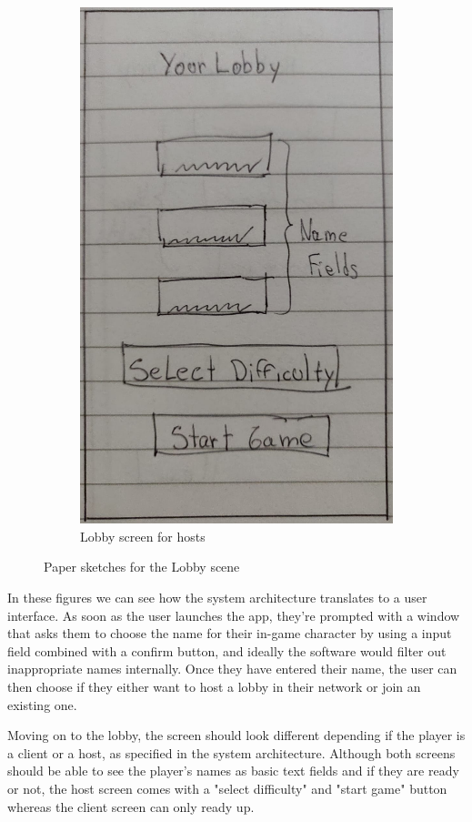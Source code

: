 \documentclass{dissertation}
\begin{document}
\begin{figure}[H]
\begin{subfigure}[h]{.5\textwidth}
\includegraphics[width = .8\linewidth]{images/paper-prototype4.jpeg}
\caption{Lobby screen for hosts}
\label{fig:pp4}
\end{subfigure}
\caption{Paper sketches for the Lobby scene}
\label{fig:lobby-menu}
\end{figure}

In these figures we can see how the system architecture translates to a user interface. As soon as the user launches the app, they're prompted with a window that asks them to choose the name for their in-game character by using a input field combined with a confirm button, and ideally the software would filter out inappropriate names internally. Once they have entered their name, the user can then choose if they either want to host a lobby in their network or join an existing one.

Moving on to the lobby, the screen should look different depending if the player is a client or a host, as specified in the system architecture. Although both screens should be able to see the player's names as basic text fields and if they are ready or not, the host screen comes with a "select difficulty" and "start game" button whereas the client screen can only ready up.
\end{document}
